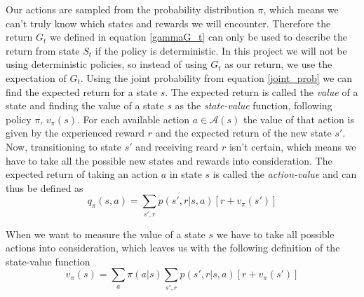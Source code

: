 \documentclass[11pt]{article}
\begin{document}
Our actions are sampled from the probability distribution $\pi$, which means
we can't truly know which states and rewards we will encounter.
Therefore the return $G_t$ we defined in equation \ref{gammaG_t}
can only be used to describe the return from state $S_t$ if 
the policy is deterministic.
In this project we will not be using deterministic policies, so instead
of using $G_t$ as our return, we use the expectation of $G_t$.
Using the joint probability from equation \ref{joint_prob} we can
find the expected return for a state $s$.
The expected return is called the \textit{value} of a state and
finding the value of a state $s$ as the \textit{state-value} function, following policy $\pi$, $v_\pi(s)$.
For each available action $a \in \mathcal{A}(s)$ the value of that action is given by
the experienced reward $r$ and the expected return of the new state $s'$.
Now, transitioning to state $s'$ and receiving reard $r$ isn't certain, which means
we have to take all the possible new states and rewards into consideration.
The expected return of taking an action $a$ in state $s$ is called the \textit{action-value}
and can thus be defined as
\begin{equation}
    q_\pi(s,a) = \sum\limits_{s', r}p(s', r|s, a) [r + v_\pi(s')]
\end{equation}

When we want to measure the value of a state $s$ we have to take all possible
actions into consideration, which leaves us with the following definition of
the state-value function
\begin{equation}
    v_\pi(s) = \sum\limits_{a} \pi(a|s) \sum\limits_{s', r}p(s', r|s, a) [r + v_\pi(s')]
\end{equation}


%
%
\end{document}
